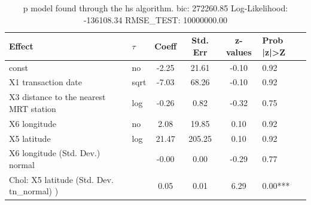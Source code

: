 \begin{table}
	\caption{p model found through the hs algorithm. bic: 272260.85 Log-Likelihood: -136108.34 RMSE_TEST: 10000000.00}
	\begin{center}
		\begin{tabular}{|l|l|c|c|c|l|}
			\hline
			Effect & $\tau$ & Coeff & Std. Err & z-values & Prob |z|>Z \\
			\hline
			const & no & -2.25 & 21.61 & -0.10 & 0.92 \\
			\hline
			X1 transaction date & sqrt & -7.03 & 68.26 & -0.10 & 0.92 \\
			\hline
			X3 distance to the nearest MRT station & log & -0.26 & 0.82 & -0.32 & 0.75 \\
			\hline
			X6 longitude & no & 2.08 & 19.85 & 0.10 & 0.92 \\
			\hline
			X5 latitude & log & 21.47 & 205.25 & 0.10 & 0.92 \\
			\hline
			X6 longitude (Std. Dev.) normal &  & -0.00 & 0.00 & -0.29 & 0.77 \\
			\hline
			 Chol: X5 latitude (Std. Dev. tn_normal) ) &  & 0.05 & 0.01 & 6.29 & 0.00*** \\
			\hline
		\end{tabular}
	\end{center}
\end{table}
